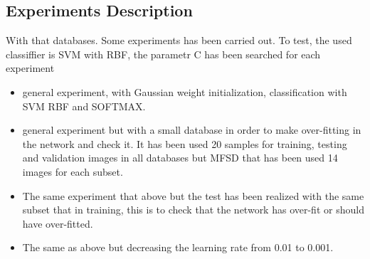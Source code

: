 \subsection{Experiments Description}
With that databases. Some experiments has been carried out. To test, the used classiffier is SVM with RBF, the parametr C has been searched for each experiment

\begin{itemize}
\item general experiment, with Gaussian weight initialization, classification with SVM RBF and SOFTMAX.
\item general experiment but with a small database in order to make over-fitting in the network and check it. It has been used 20 samples for training, testing and validation images in all databases but MFSD that has been used 14 images for each subset.
\item The same experiment that above but the test has been realized with the same subset that in training, this is to check that the network has over-fit or should have over-fitted.
\item The same as above but decreasing the learning rate from 0.01 to 0.001. \\
\end{itemize}

